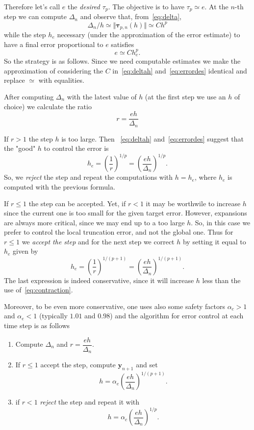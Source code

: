 \documentclass[10pt,a4paper,twoside]{article}
\begin{document}
 Therefore let's call $e$ the \emph{desired $\tau_p$}. The objective is to have 
 $\tau_p\simeq e$. At the $n$-th step we can compute $\Delta_n$ and observe that, from~\eqref{eq:delta},
\begin{equation}\label{eq:deltah}
\Delta_n/h \simeq \Vert \boldsymbol\tau_{p,n}(h)\Vert \simeq C h^{p}
\end{equation}
while the step $h_e$ necessary (under the approximation of the error estimate) to have a final error proportional to $e$ satisfies
\begin{equation}\label{eq:errordes}
e\simeq C h_e^p.
\end{equation}
So the strategy is as follows. Since we need computable estimates we make the approximation 
of considering the  $C$ in~\eqref{eq:deltah} and~\eqref{eq:errordes} identical and replace $\simeq$ with equalities. 

After computing $\Delta_n$ with the latest value of $h$ (at the first step we use an $h$ of choice) we calculate the ratio
\[
r=\dfrac{eh}{\Delta_n}
\]

If $r>1$ the step $h$ is too large. Then ~\eqref{eq:deltah} and~\eqref{eq:errordes} suggest that the "good" $h$ to control the error is
\begin{equation}\label{eq:contraction}
h_e = \left(\dfrac{1}{r}\right)^{1/p}=\left(\dfrac{eh}{\Delta_n}\right)^{1/p}.
\end{equation}
So, we \emph{reject} the step and repeat the computations with $h=h_e$, where $h_e$ is computed with the previous formula.

If $r\le 1$ the step can be accepted. Yet, if $r<1$ it may be worthwile to increase $h$ since the current one is too small for the given target error. However, expansions are always more critical, since we may end up to a too large $h$. So, in this case we prefer to control the local truncation error, and not the global one. Thus for $r \le 1$ we \emph{accept the step} and for the next step we correct $h$ by setting it equal to $h_e$ given by
\begin{equation}\label{eq:expansion}
h_e = \left(\dfrac{1}{r}\right)^{1/(p+1)}=\left(\dfrac{eh}{\Delta_n}\right)^{1/(p+1)}.
\end{equation}
The last expression is indeed conservative, since it will increase $h$ less than the 
use of~\eqref{eq:contraction}.

Moreover, to be even more conservative, one uses also some safety factors $\alpha_c>1$ and $\alpha_e<1$ (typically $1.01$ and $0.98$) and the algorithm for error control at each time step is as follows
\begin{enumerate}
    \item Compute $\Delta_n$ and $r=\dfrac{eh}{\Delta_n}$.
    \item If $r\le 1$ accept the step, compute $\mathbf{y}_{n+1}$ and set
    \[
    h = \alpha_e\left(\dfrac{eh}{\Delta_n}\right)^{1/(p+1)}.
    \]
    \item if $r<1$ \emph{reject} the step and repeat it with
    \[
    h = \alpha_c\left(\dfrac{eh}{\Delta_n}\right)^{1/p}.
    \]
\end{enumerate}
\end{document}
